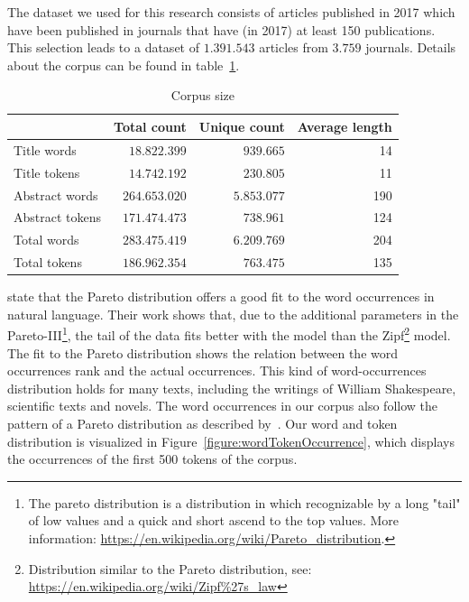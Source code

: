 \documentclass[../../Thesis.tex]{subfiles}
\begin{document}
The dataset we used for this research consists of articles published in 2017 which have been published in journals that have (in 2017) at least 150 publications. This selection leads to a dataset of $1.391.543$ articles from $3.759$ journals. Details about the corpus can be found in table~\ref{table:corpusSize}.
\begin{table}[hbt]
\begin{center}
\begin{tabular}{|l|r|r|r|}
\hline
 & Total count & Unique count & Average length\footnotemark \\
\hline\hline
Title words & $18.822.399$ & $939.665$ & 14  \\
\hline
Title tokens & $14.742.192$ & $230.805$ & 11 \\
\hline\hline
Abstract words & $264.653.020$ & $5.853.077$  & 190  \\
\hline
Abstract tokens & $171.474.473$ & $738.961$ & 124 \\
\hline\hline
Total words & $283.475.419$ & $6.209.769$  & 204 \\
\hline
Total tokens & $186.962.354$ & $763.475$ & 135 \\
\hline
\end{tabular}
\end{center}
\caption{Corpus size}\label{table:corpusSize}
\end{table}
\clearpage
{}
\citet{wiegand2018word} state that the Pareto distribution offers a good fit to the word occurrences in natural language. Their work shows that, due to the additional parameters in the Pareto-III\footnote{The pareto distribution is a distribution in which recognizable by a long "tail" of low values and a quick and short ascend to the top values. More information: \url{https://en.wikipedia.org/wiki/Pareto_distribution}.}, the tail of the data fits better with the model than the Zipf\footnote{Distribution similar to the Pareto distribution, see: \url{https://en.wikipedia.org/wiki/Zipf\%27s_law}} model. The fit to the Pareto distribution shows the relation between the word occurrences rank and the actual occurrences. This kind of word-occurrences distribution holds for many texts, including the writings of William Shakespeare, scientific texts and novels\cite{thurner2015understanding}.
The word occurrences in our corpus also follow the pattern of a Pareto distribution as described by~\citet{wiegand2018word}. Our word and token distribution is visualized in Figure~\ref{figure:wordTokenOccurrence}, which displays the occurrences of the first 500 tokens of the corpus.
\end{document}
